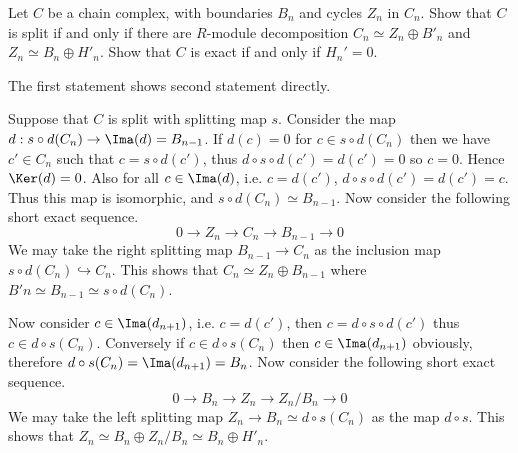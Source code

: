 \begin{exer} Let $C$ be a chain complex, with boundaries $B_n$ and cycles $Z_n$ in $C_n$. Show that $C$ is split if and only if there are $R$-module decomposition $C_n\simeq Z_n\oplus B'_n$ and $Z_n\simeq B_n\oplus H'_n$. Show that $C$ is exact if and only if $H_n'=0$.
\end{exer}
\begin{solution} The first statement shows second statement directly.

Suppose that $C$ is split with splitting map $s$. Consider the map $d:s\circ d(C_n)\rightarrow \Ima(d)=B_{n-1}$. If $d(c)=0$ for $c\in s\circ d(C_n)$ then we have $c'\in C_n$ such that $c=s\circ d(c')$, thus $d\circ s\circ d(c')=d(c')=0$ so $c=0$. Hence $\Ker(d)=0$. Also for all $c\in \Ima(d)$, i.e. $c=d(c')$, $d\circ s\circ d(c')=d(c')=c$. Thus this map is isomorphic, and $s\circ d(C_n)\simeq B_{n-1}$. Now consider the following short exact sequence.
\begin{equation}
0\rightarrow Z_n\rightarrow C_n\rightarrow B_{n-1}\rightarrow 0
\end{equation}
We may take the right splitting map $B_{n-1}\rightarrow C_n$ as the inclusion map $s\circ d(C_n)\hookrightarrow C_n$. This shows that $C_n\simeq Z_n\oplus B_{n-1}$ where $B'n\simeq B_{n-1}\simeq s\circ d(C_n)$.

Now consider $c\in \Ima(d_{n+1})$, i.e. $c=d(c')$, then $c=d\circ s\circ d(c')$ thus $c\in d\circ s(C_n)$. Conversely if $c\in d\circ s(C_n)$ then $c\in \Ima(d_{n+1})$ obviously, therefore $d\circ s(C_n)=\Ima(d_{n+1})=B_n$. Now consider the following short exact sequence.
\begin{equation}
0\rightarrow B_n\rightarrow Z_n\rightarrow Z_n/B_n\rightarrow 0
\end{equation}
We may take the left splitting map $Z_n\rightarrow B_n\simeq d\circ s(C_n)$ as the map $d\circ s$. This shows that $Z_n\simeq B_n\oplus Z_n/B_n\simeq B_n\oplus H'_n$.


\end{solution}
